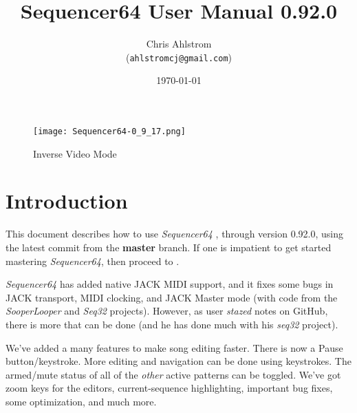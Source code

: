 \documentclass[
 11pt,
 twoside,
 a4paper,
 headinclude,
 footinclude,
 final                                 %
]{article}
\begin{document}
\title{Sequencer64 User Manual 0.92.0}
\author{Chris Ahlstrom \\
   (\texttt{ahlstromcj@gmail.com})}
\date{\today}
\maketitle

\begin{figure}[H]
   \centering 
   \texttt{[image: Sequencer64-0\_9\_17.png]}
   \caption*{Inverse Video Mode}
\end{figure}

\clearpage                             %

\tableofcontents
\listoffigures                         %
\listoftables                          %


\setlength{\parindent}{0pt}
\setlength{\parskip}{1ex plus 0.5ex minus 0.2ex}

\section{Introduction}
\label{sec:introduction}

   This document describes how to use \textsl{Sequencer64}
   \cite{sequencer64}, through version 0.92.0,
   using the latest commit from the \textbf{master} branch.
   If one is impatient to get started mastering \textsl{Sequencer64},
   then proceed to .

   \textsl{Sequencer64} has added native JACK MIDI support,
   and it fixes some bugs in JACK transport, MIDI clocking, and
   JACK Master mode (with code from the \textsl{SooperLooper} 
   and \textsl{Seq32} projects).
   However, as user \textsl{stazed} notes on GitHub, there is more that can be
   done (and he has done much with his \textsl{seq32} \cite{seq32} project).

   We've added a many features to make song editing faster.
   There is now a Pause button/keystroke.
   More editing and navigation can be done using keystrokes.
   The armed/mute status of all of the \textsl{other} active patterns can be
   toggled.
   We've got zoom keys for the editors, current-sequence highlighting,
   important bug fixes, some optimization, and much more.
\end{document}
